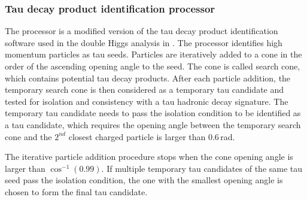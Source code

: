 



\subsubsection{Tau decay product identification processor}

The \BonoTauFinder processor is a modified version of the tau decay product identification software used in the double Higgs analysis in . The processor identifies high momentum particles as tau seeds. Particles are iteratively added to a cone in the order of the ascending opening angle to the seed. The cone is called search cone, which contains potential tau decay products. After each particle addition, the temporary search cone is then considered as a temporary  tau candidate and tested for isolation and consistency  with a tau hadronic decay signature. The temporary tau candidate  needs to pass the isolation condition to be identified as a tau candidate, which requires the opening angle between the temporary search cone  and the $2^{nd}$ closest charged particle is larger than 0.6\,rad.

The iterative particle addition procedure stops when the cone opening angle is larger than $\cos^{-1}(0.99)$. If multiple temporary tau candidates of the same tau seed pass the isolation condition, the one with the smallest opening angle is chosen to form the final tau candidate.

